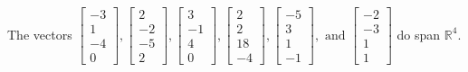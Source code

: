 \begin{exercise}
\begin{exerciseStatement}
  \end{exerciseStatement}
  \begin{exerciseAnswer}
   The vectors \(\left[\begin{array}{r}
-3 \\
1 \\
-4 \\
0
\end{array}\right] , \left[\begin{array}{r}
2 \\
-2 \\
-5 \\
2
\end{array}\right] , \left[\begin{array}{r}
3 \\
-1 \\
4 \\
0
\end{array}\right] , \left[\begin{array}{r}
2 \\
2 \\
18 \\
-4
\end{array}\right] , \left[\begin{array}{r}
-5 \\
3 \\
1 \\
-1
\end{array}\right] , \text{ and } \left[\begin{array}{r}
-2 \\
-3 \\
1 \\
1
\end{array}\right]\) 
  	 do  
	span \(\mathbb{R}^4\).
  


  \end{exerciseAnswer}
\end{exercise}
